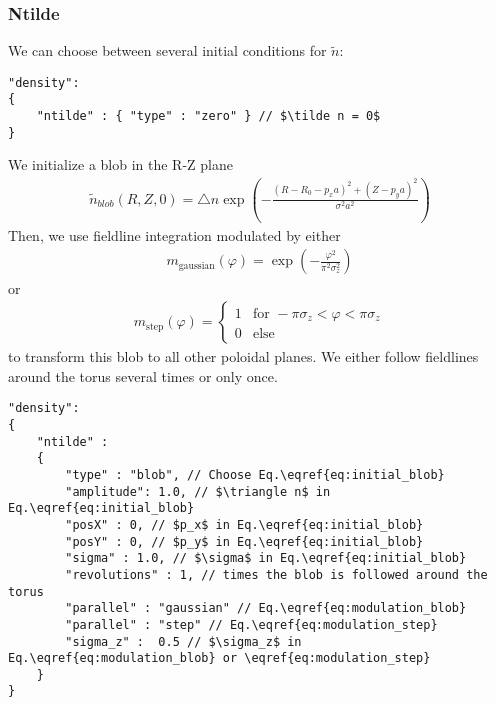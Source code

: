 \subsubsection{Ntilde} \label{sec:ntilde}
We can choose between several initial conditions for $\tilde n$:
\begin{verbatim}
"density":
{
    "ntilde" : { "type" : "zero" } // $\tilde n = 0$
}
\end{verbatim}

We initialize a blob in the R-Z plane
\begin{align} \label{eq:initial_blob}
  \tilde n_{blob}(R,Z,0) = \triangle n \exp\left( -\frac{(R - R_0 - p_x a)^2 + (Z-p_ya)^2}{\sigma^2 a^2} \right)
\end{align}
Then, we use fieldline integration modulated by either
\begin{align} \label{eq:modulation_blob}
    m_{\text{gaussian}}(\varphi) = \exp\left( -\frac{\varphi^2 }{\pi^2\sigma_z^2} \right)
\end{align}
or
\begin{align} \label{eq:modulation_step}
    m_{\text{step}}(\varphi) = \begin{cases}
        1 &\text{for } -\pi\sigma_z < \varphi < \pi \sigma_z \\
        0 & \text{else}
    \end{cases}
\end{align}
to transform this blob to all other poloidal planes.
We either follow fieldlines around the torus several times or only once.
\begin{verbatim}
"density":
{
    "ntilde" :
    {
        "type" : "blob", // Choose Eq.\eqref{eq:initial_blob}
        "amplitude": 1.0, // $\triangle n$ in Eq.\eqref{eq:initial_blob}
        "posX" : 0, // $p_x$ in Eq.\eqref{eq:initial_blob}
        "posY" : 0, // $p_y$ in Eq.\eqref{eq:initial_blob}
        "sigma" : 1.0, // $\sigma$ in Eq.\eqref{eq:initial_blob}
        "revolutions" : 1, // times the blob is followed around the torus
        "parallel" : "gaussian" // Eq.\eqref{eq:modulation_blob}
        "parallel" : "step" // Eq.\eqref{eq:modulation_step}
        "sigma_z" :  0.5 // $\sigma_z$ in Eq.\eqref{eq:modulation_blob} or \eqref{eq:modulation_step}
    }
}
\end{verbatim}


